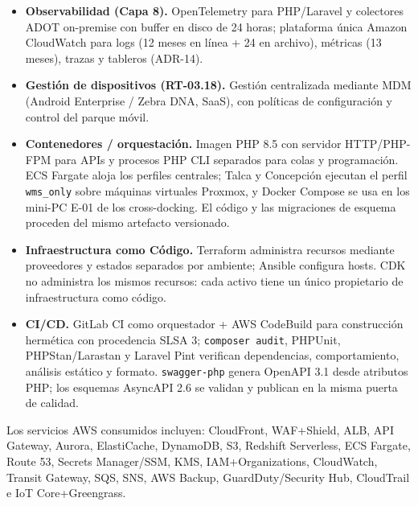 \begin{itemize}
  \item \textbf{Observabilidad (Capa 8).} OpenTelemetry para PHP/Laravel y colectores ADOT on-premise con buffer en disco de 24 horas; plataforma única Amazon CloudWatch para logs (12 meses en línea + 24 en archivo), métricas (13 meses), trazas y tableros (ADR-14).
  \item \textbf{Gestión de dispositivos (RT-03.18).} Gestión centralizada mediante MDM (Android Enterprise / Zebra DNA, SaaS), con políticas de configuración y control del parque móvil.
  \item \textbf{Contenedores / orquestación.} Imagen PHP 8.5 con servidor HTTP/PHP-FPM para APIs y procesos PHP CLI separados para colas y programación. ECS Fargate aloja los perfiles centrales; Talca y Concepción ejecutan el perfil \texttt{wms\_only} sobre máquinas virtuales Proxmox, y Docker Compose se usa en los mini-PC E-01 de los cross-docking. El código y las migraciones de esquema proceden del mismo artefacto versionado.
  \item \textbf{Infraestructura como Código.} Terraform administra recursos mediante proveedores y estados separados por ambiente; Ansible configura hosts. CDK no administra los mismos recursos: cada activo tiene un único propietario de infraestructura como código.
  \item \textbf{CI/CD.} GitLab CI como orquestador + AWS CodeBuild para construcción hermética con procedencia SLSA 3; \texttt{composer audit}, PHPUnit, PHPStan/Larastan y Laravel Pint verifican dependencias, comportamiento, análisis estático y formato. \texttt{swagger-php} genera OpenAPI 3.1 desde atributos PHP; los esquemas AsyncAPI 2.6 se validan y publican en la misma puerta de calidad.
\end{itemize}

Los servicios AWS consumidos incluyen: CloudFront, WAF+Shield, ALB, API Gateway, Aurora, ElastiCache, DynamoDB, S3, Redshift Serverless, ECS Fargate, Route 53, Secrets Manager/SSM, KMS, IAM+Organizations, CloudWatch, Transit Gateway, SQS, SNS, AWS Backup, GuardDuty/Security Hub, CloudTrail e IoT Core+Greengrass.

